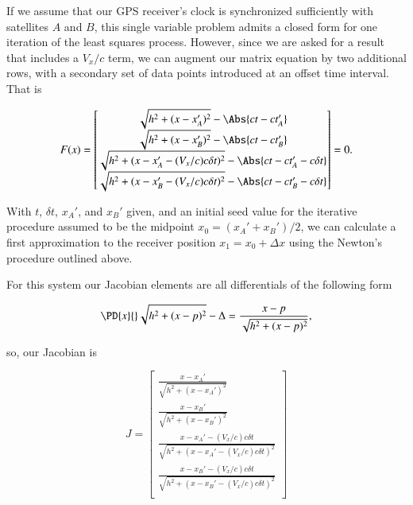 If we assume that our GPS receiver's clock is synchronized sufficiently with satellites $A$ and $B$, this single variable problem admits a closed form for one iteration of the least squares process.  However, since we are asked for a result that includes a $V_x/c$ term, we can augment our matrix equation by two additional rows, with a secondary set of data points introduced at an offset time interval.  That is

\begin{equation}\label{eqn:relativisticElectrodynamicsA1:360}
F(x) = 
\begin{bmatrix}
\sqrt{ h^2 + (x - x_A')^2 } - \Abs{c t - c t_A'} \\
\sqrt{ h^2 + (x - x_B')^2 } - \Abs{c t - c t_B'} \\
\sqrt{ h^2 + (x - x_A' - (V_x/c) c \delta t)^2 } - \Abs{c t - c t_A' - c \delta t} \\
\sqrt{ h^2 + (x - x_B' - (V_x/c) c \delta t)^2 } - \Abs{c t - c t_B' - c \delta t} \\
\end{bmatrix} = 0.
\end{equation}

With $t$, $\delta t$, $x_A'$, and $x_B'$ given, and an initial seed value for the iterative procedure assumed to be the midpoint $x_0 = (x_A' + x_B')/2$, we can calculate a first approximation to the receiver position $x_1 = x_0 + \Delta x$ using the Newton's procedure outlined above.

For this system our Jacobian elements are all differentials of the following form

\begin{equation}\label{eqn:relativisticElectrodynamicsA1:370}
\PD{x}{} \sqrt{ h^2 + (x - p)^2 } - \Delta = \frac{x-p}{\sqrt{h^2 + (x-p)^2}},
\end{equation}

so, our Jacobian is

\begin{equation}\label{eqn:relativisticElectrodynamicsA1:380}
J = 
\begin{bmatrix}
\frac{x - x_A'}{\sqrt{ h^2 + (x - x_A')^2 } } \\
\frac{x - x_B'}{\sqrt{ h^2 + (x - x_B')^2 } } \\
\frac{x - x_A' - (V_x/c) c \delta t}{\sqrt{ h^2 + (x - x_A' - (V_x/c) c \delta t)^2 } } \\
\frac{x - x_B' - (V_x/c) c \delta t}{\sqrt{ h^2 + (x - x_B' - (V_x/c) c \delta t)^2 } } \\
\end{bmatrix}
\end{equation}

